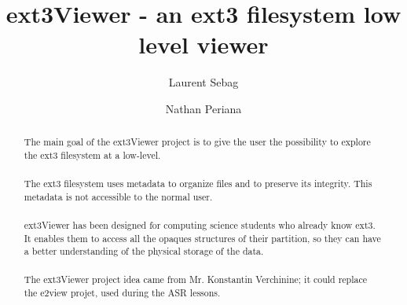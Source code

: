 \documentclass[a4paper,oneside,12pt,final]{article}
\begin{document}
\title{ext3Viewer - an ext3 filesystem low level viewer}
\author{Laurent Sebag \and Nathan Periana}

\maketitle

\begin{abstract}
\subsubsection*{}
The main goal of the ext3Viewer project is to give the user the possibility to
explore the ext3 filesystem at a low-level.
\subsubsection*{}
The ext3 filesystem uses metadata to organize files and to preserve its 
integrity. This metadata is not accessible to the normal user.
\subsubsection*{}
ext3Viewer has been designed for computing science students who already know 
ext3. It enables them to access all the opaques structures of their partition,
so they can have a better understanding of the physical storage of the data.
\subsubsection*{}
The ext3Viewer project idea came from Mr. Konstantin Verchinine; it could
replace the e2view projet, used during the ASR lessons.
\end{abstract}

\thispagestyle{empty}
\end{document}
